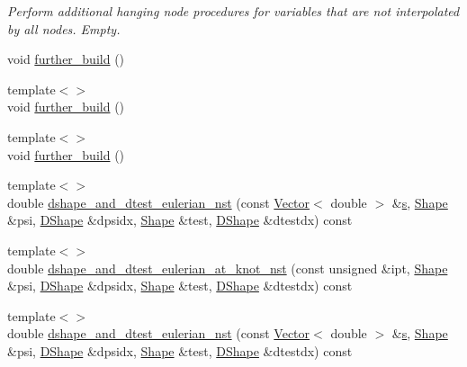 \begin{DoxyCompactItemize}
\begin{DoxyCompactList}\small\item\em Perform additional hanging node procedures for variables that are not interpolated by all nodes. Empty. \end{DoxyCompactList}\item 
void \hyperlink{classoomph_1_1PRefineableQCrouzeixRaviartElement_a3129fe3450caf60d2f678024d7bf7f08}{further\+\_\+build} ()
\item 
{\footnotesize template$<$$>$ }\\void \hyperlink{classoomph_1_1PRefineableQCrouzeixRaviartElement_a98e341f00435e0c9b81c0615412bd734}{further\+\_\+build} ()
\item 
{\footnotesize template$<$$>$ }\\void \hyperlink{classoomph_1_1PRefineableQCrouzeixRaviartElement_a4d5c10a7a11d43c4af08196b95e4803e}{further\+\_\+build} ()
\item 
{\footnotesize template$<$$>$ }\\double \hyperlink{classoomph_1_1PRefineableQCrouzeixRaviartElement_a8ded9a5c48d5112468313b1354ad5b44}{dshape\+\_\+and\+\_\+dtest\+\_\+eulerian\+\_\+nst} (const \hyperlink{classoomph_1_1Vector}{Vector}$<$ double $>$ \&\hyperlink{cfortran_8h_ab7123126e4885ef647dd9c6e3807a21c}{s}, \hyperlink{classoomph_1_1Shape}{Shape} \&psi, \hyperlink{classoomph_1_1DShape}{D\+Shape} \&dpsidx, \hyperlink{classoomph_1_1Shape}{Shape} \&test, \hyperlink{classoomph_1_1DShape}{D\+Shape} \&dtestdx) const
\item 
{\footnotesize template$<$$>$ }\\double \hyperlink{classoomph_1_1PRefineableQCrouzeixRaviartElement_a1537fd64ea853532de2f09b48b0d1db8}{dshape\+\_\+and\+\_\+dtest\+\_\+eulerian\+\_\+at\+\_\+knot\+\_\+nst} (const unsigned \&ipt, \hyperlink{classoomph_1_1Shape}{Shape} \&psi, \hyperlink{classoomph_1_1DShape}{D\+Shape} \&dpsidx, \hyperlink{classoomph_1_1Shape}{Shape} \&test, \hyperlink{classoomph_1_1DShape}{D\+Shape} \&dtestdx) const
\item 
{\footnotesize template$<$$>$ }\\double \hyperlink{classoomph_1_1PRefineableQCrouzeixRaviartElement_adb1580b8713df0efdda70ddf47afda20}{dshape\+\_\+and\+\_\+dtest\+\_\+eulerian\+\_\+nst} (const \hyperlink{classoomph_1_1Vector}{Vector}$<$ double $>$ \&\hyperlink{cfortran_8h_ab7123126e4885ef647dd9c6e3807a21c}{s}, \hyperlink{classoomph_1_1Shape}{Shape} \&psi, \hyperlink{classoomph_1_1DShape}{D\+Shape} \&dpsidx, \hyperlink{classoomph_1_1Shape}{Shape} \&test, \hyperlink{classoomph_1_1DShape}{D\+Shape} \&dtestdx) const

\end{DoxyCompactItemize}
